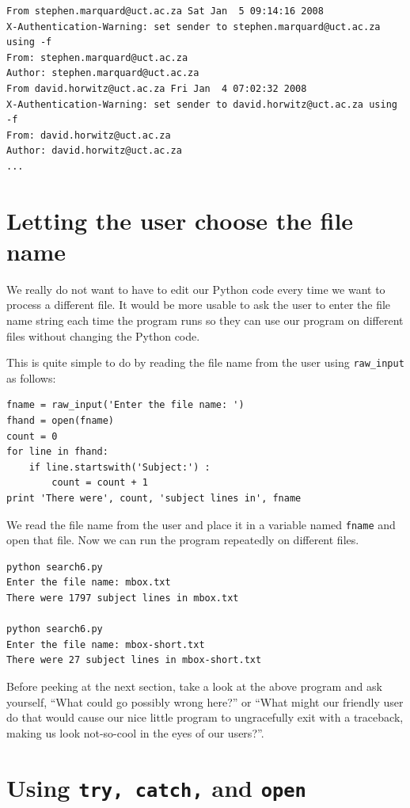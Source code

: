 \documentclass[10pt]{book}
\begin{document}
\beforeverb
\begin{verbatim}
From stephen.marquard@uct.ac.za Sat Jan  5 09:14:16 2008
X-Authentication-Warning: set sender to stephen.marquard@uct.ac.za using -f
From: stephen.marquard@uct.ac.za
Author: stephen.marquard@uct.ac.za
From david.horwitz@uct.ac.za Fri Jan  4 07:02:32 2008
X-Authentication-Warning: set sender to david.horwitz@uct.ac.za using -f
From: david.horwitz@uct.ac.za
Author: david.horwitz@uct.ac.za
...
\end{verbatim}
\afterverb
%

\section{Letting the user choose the file name}

We really do not want to have to edit our Python code
every time we want to process a different file.  It would 
be more usable to ask the user to enter the file name string 
each time the program runs so they can use our 
program on different files without changing the Python code.

This is quite simple to do by reading the file name from
the user using \verb"raw_input" as follows:

\beforeverb
\begin{verbatim}
fname = raw_input('Enter the file name: ')
fhand = open(fname)
count = 0
for line in fhand:
    if line.startswith('Subject:') :
        count = count + 1
print 'There were', count, 'subject lines in', fname
\end{verbatim}
\afterverb
%
We read the file name from the user and place it in a variable
named {\tt fname} and open that file.  Now we can run the program 
repeatedly on different files.

\beforeverb
\begin{verbatim}
python search6.py 
Enter the file name: mbox.txt
There were 1797 subject lines in mbox.txt

python search6.py 
Enter the file name: mbox-short.txt
There were 27 subject lines in mbox-short.txt
\end{verbatim}
\afterverb
%
Before peeking at the next section, take a look at the above program
and ask yourself, ``What could go possibly wrong here?'' or ``What might our
friendly user do that would cause our nice little program to 
ungracefully exit with a traceback, making us look not-so-cool 
in the eyes of our users?''.

\section{Using {\tt try, catch,} and {\tt open}}
\end{document}
